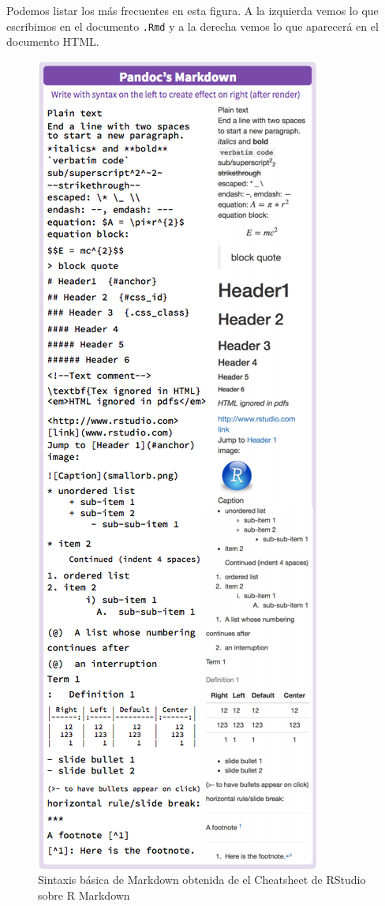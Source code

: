 \documentclass[
]{book}
\begin{document}
Podemos listar los más frecuentes en esta figura. A la izquierda vemos lo que escribimos en el documento \texttt{.Rmd} y a la derecha vemos lo que aparecerá en el documento HTML.

\begin{figure}
\centering
\includegraphics{figures/chuleta_markdown.png}
\caption{Sintaxis básica de Markdown obtenida de el Cheatsheet de RStudio sobre R Markdown}
\end{figure}
\end{document}
